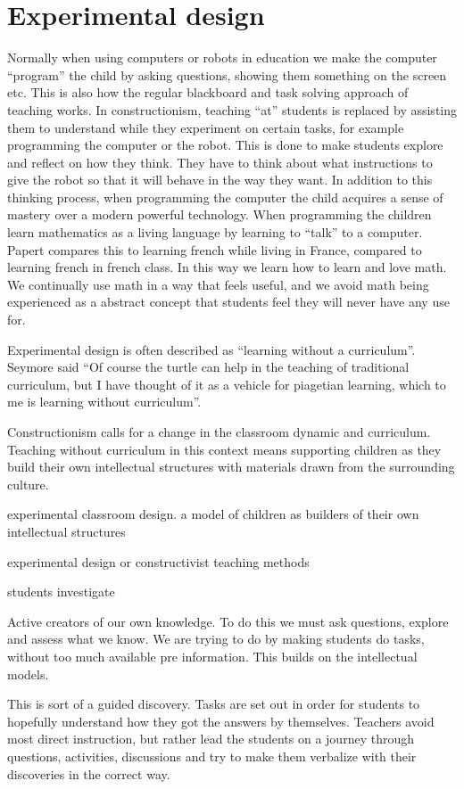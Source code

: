 \section{Experimental design}
Normally when using computers or robots in education we make the computer ``program'' the child by asking questions, showing them something on the screen etc. This is also how the regular blackboard and task solving approach of teaching works. In constructionism, teaching ``at'' students is replaced by assisting them to understand while they experiment on certain tasks, for example programming the computer or the robot. This is done to make students explore and reflect on how they think. They have to think about what instructions to give the robot so that it will behave in the way they want. In addition to this thinking process, when programming the computer the child acquires a sense of mastery over a modern powerful technology. When programming the children learn mathematics as a living language by learning to ``talk'' to a computer. Papert compares this to learning french while living in France, compared to learning french in french class. In this way we learn how to learn and love math. We continually use math in a way that feels useful, and we avoid math being experienced as a abstract concept that students feel they will never have any use for. 

\bigskip\noindent
Experimental design is often described as ``learning without a curriculum''. Seymore said ``Of course the turtle can help in the teaching of traditional curriculum, but I have thought of it as a vehicle for piagetian learning, which to me is learning without curriculum''.

Constructionism calls for a change in the classroom dynamic and curriculum. Teaching without curriculum in this context means supporting children as they build their own intellectual structures with materials drawn from the surrounding culture.

\bigskip\noindent
experimental classroom design. a model of children as builders of their own intellectual structures

\bigskip\noindent
experimental design or constructivist teaching methods

\bigskip\noindent
students investigate 

\bigskip\noindent
Active creators of our own knowledge. To do this we must ask questions, explore and assess what we know. We are trying to do by making students do tasks, without too much available pre information. This builds on the intellectual models. 

\bigskip\noindent
This is sort of a guided discovery. Tasks are set out in order for students to hopefully understand how they got the answers by themselves. Teachers avoid most direct instruction, but rather lead the students on a journey through questions, activities, discussions and try to make them verbalize with their discoveries in the correct way.